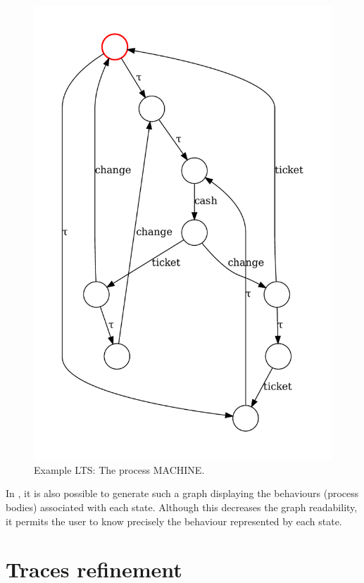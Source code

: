 \begin{figure}[htb]
	\caption[Example LTS: The process MACHINE]{Example LTS: The process MACHINE.}
	\label{image:machine_lts}
	\begin{center}
		\includegraphics[scale=0.55]{images/parking_permit_mch_lts.pdf}
	\end{center}
\end{figure}

In \CSPcoq, it is also possible to generate such a graph displaying the behaviours (process bodies) associated with each state. Although this decreases the graph readability, it permits the user to know precisely the behaviour represented by each state.

\section{Traces refinement}
\label{section:traces}

